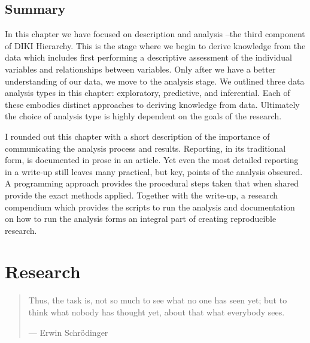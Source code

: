 \documentclass[
  letterpaper,
]{latex/krantz}
\theoremstyle{definition}
\theoremstyle{remark}
\begin{document}
\section*{Summary}\label{summary-2}


In this chapter we have focused on description and analysis --the third
component of DIKI Hierarchy. This is the stage where we begin to derive
knowledge from the data which includes first performing a descriptive
assessment of the individual variables and relationships between
variables. Only after we have a better understanding of our data, we
move to the analysis stage. We outlined three data analysis types in
this chapter: exploratory, predictive, and inferential. Each of these
embodies distinct approaches to deriving knowledge from data. Ultimately
the choice of analysis type is highly dependent on the goals of the
research.

I rounded out this chapter with a short description of the importance of
communicating the analysis process and results. Reporting, in its
traditional form, is documented in prose in an article. Yet even the
most detailed reporting in a write-up still leaves many practical, but
key, points of the analysis obscured. A programming approach provides
the procedural steps taken that when shared provide the exact methods
applied. Together with the write-up, a research compendium which
provides the scripts to run the analysis and documentation on how to run
the analysis forms an integral part of creating reproducible research.

\chapter{Research}\label{sec-research-chapter}

\begin{quote}
Thus, the task is, not so much to see what no one has seen yet; but to
think what nobody has thought yet, about that what everybody sees.

--- Erwin Schrödinger
\end{quote}
\end{document}
